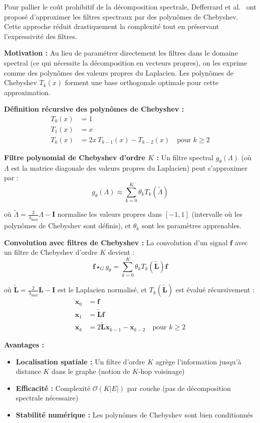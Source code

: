 Pour pallier le coût prohibitif de la décomposition spectrale, Defferrard et al.~\cite{Defferrard2016} ont proposé d'approximer les filtres spectraux par des polynômes de Chebyshev. Cette approche réduit drastiquement la complexité tout en préservant l'expressivité des filtres.

\textbf{Motivation :}
Au lieu de paramétrer directement les filtres dans le domaine spectral (ce qui nécessite la décomposition en vecteurs propres), on les exprime comme des polynômes des valeurs propres du Laplacien. Les polynômes de Chebyshev $T_k(x)$ forment une base orthogonale optimale pour cette approximation.

\textbf{Définition récursive des polynômes de Chebyshev :}
\begin{align*}
T_0(x) &= 1 \\
T_1(x) &= x \\
T_k(x) &= 2x \, T_{k-1}(x) - T_{k-2}(x) \quad \text{pour } k \geq 2
\end{align*}

\textbf{Filtre polynomial de Chebyshev d'ordre $K$ :}
Un filtre spectral $g_\theta(\Lambda)$ (où $\Lambda$ est la matrice diagonale des valeurs propres du Laplacien) peut s'approximer par :
\[
g_\theta(\Lambda) \approx \sum_{k=0}^{K} \theta_k T_k(\tilde{\Lambda})
\]

où $\tilde{\Lambda} = \frac{2}{\lambda_{\max}}\Lambda - \mathbf{I}$ normalise les valeurs propres dans $[-1, 1]$ (intervalle où les polynômes de Chebyshev sont définis), et $\theta_k$ sont les paramètres apprenables.

\textbf{Convolution avec filtres de Chebyshev :}
La convolution d'un signal $\mathbf{f}$ avec un filtre de Chebyshev d'ordre $K$ devient :
\[
\mathbf{f} \star_G g_\theta = \sum_{k=0}^{K} \theta_k T_k(\tilde{\mathbf{L}}) \mathbf{f}
\]

où $\tilde{\mathbf{L}} = \frac{2}{\lambda_{\max}}\mathbf{L} - \mathbf{I}$ est le Laplacien normalisé, et $T_k(\tilde{\mathbf{L}})$ est évalué récursivement :
\begin{align*}
\mathbf{x}_0 &= \mathbf{f} \\
\mathbf{x}_1 &= \tilde{\mathbf{L}} \mathbf{f} \\
\mathbf{x}_k &= 2\tilde{\mathbf{L}} \mathbf{x}_{k-1} - \mathbf{x}_{k-2} \quad \text{pour } k \geq 2
\end{align*}

\textbf{Avantages :}
\begin{itemize}
    \item \textbf{Localisation spatiale :} Un filtre d'ordre $K$ agrège l'information jusqu'à distance $K$ dans le graphe (notion de $K$-hop voisinage)
    \item \textbf{Efficacité :} Complexité $\mathcal{O}(K|E|)$ par couche (pas de décomposition spectrale nécessaire)
    \item \textbf{Stabilité numérique :} Les polynômes de Chebyshev sont bien conditionnés
\end{itemize}

